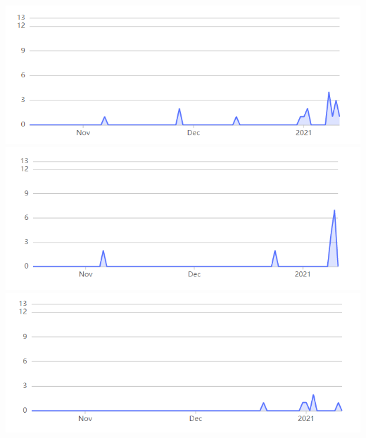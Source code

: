 		\includegraphics[scale=0.5]{slike/commit6.png}
		\includegraphics[scale=0.5]{slike/commit7.png}
		\includegraphics[scale=0.5]{slike/commit8.png}

		
	